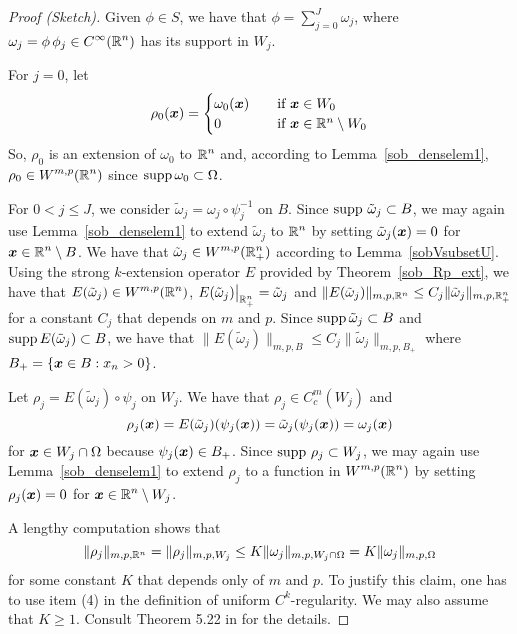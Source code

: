 \begin{proof}[Proof (Sketch)]
Given $\phi \in S$, we have that
$\displaystyle \phi = \sum_{j=0}^J \omega_j$, where
$\displaystyle \omega_j = \phi\, \phi_j \in C^\infty(\mathbb{R}^n)$ has its
support in $W_j$.

For $j=0$, let
\[
\rho_0({\bm{x}})
= \begin{cases}
\omega_0({\bm{x}}) & \quad \text{if} \ {\bm{x}} \in W_0 \\
0 & \quad  \text{if} \ {\bm{x}} \in \mathbb{R}^n\setminus W_0
  \end{cases}
\]
So, $\rho_0$ is an extension of $\omega_0$ to $\displaystyle \mathbb{R}^n$ and,
according to Lemma~\ref{sob_denselem1},
$\displaystyle \rho_0 \in W^{m,p}(\mathbb{R}^n)$
since $\operatorname{supp} \omega_0 \subset \Omega$.

For $0< j \leq J$, we consider
$\displaystyle \tilde{\omega}_j = \omega_j \circ \psi_j^{-1}$ on $B$.
Since $\operatorname{supp}\, \tilde{\omega}_j \subset B$, we may again use
Lemma~\ref{sob_denselem1} to extend $\tilde{\omega}_j$ to
$\displaystyle \mathbb{R}^n$ by setting
$\tilde{\omega}_j({\bm{x}}) = 0$ for
$\displaystyle {\bm{x}} \in \mathbb{R}^n \setminus B$.  We have that
$\displaystyle \tilde{\omega}_j \in W^{m,p}(\mathbb{R}^n_+)$
according to Lemma~\ref{sobVsubsetU}.
Using the strong $k$-extension operator $E$
provided by Theorem~\ref{sob_Rp_ext}, we have that
$\displaystyle E(\tilde{\omega}_j) \in W^{m,p}(\mathbb{R}^n)$,
$E(\tilde{\omega}_j)\big|_{\mathbb{R}^n_+} = \tilde{\omega}_j$ and
$\displaystyle \|E(\tilde{\omega}_j)\|_{m,p,\mathbb{R}^n} \leq
C_j \|\tilde{\omega}_j\|_{m,p,\mathbb{R}^n_+}$
for a constant $C_j$ that depends on $m$ and $p$.
Since $\operatorname{supp} \tilde{\omega}_j \subset B$ and
$\operatorname{supp} E(\tilde{\omega}_j) \subset B$, we have that
$\displaystyle \|E(\tilde{\omega}_j)\|_{m,p,B} \leq
C_j \|\tilde{\omega}_j\|_{m,p,B_+}$ where $B_+= \{{\bm{x}} \in B : x_n> 0\}$.

Let $\rho_j = E(\tilde{\omega}_j) \circ \psi_j$ on $W_j$.  We have
that $\displaystyle \rho_j \in C_c^m(W_j)$ and
\[
\rho_j({\bm{x}}) = E(\tilde{\omega}_j)(\psi_j({\bm{x}}))
= \tilde{\omega}_j(\psi_j({\bm{x}})) = \omega_j({\bm{x}})
\]
for ${\bm{x}} \in W_j \cap \Omega$ because $\psi_j({\bm{x}}) \in B_+$. 
Since $\operatorname{supp}\, \rho_j \subset W_j$, we may again use
Lemma~\ref{sob_denselem1} to extend $\rho_j$ to a
function in $\displaystyle W^{m,p}(\mathbb{R}^n)$ by setting
$\rho_j({\bm{x}}) = 0$ for $\displaystyle {\bm{x}} \in \mathbb{R}^n \setminus W_j$.

A lengthy computation shows that
\[
  \|\rho_j\|_{m,p,\mathbb{R}^n} = \|\rho_j\|_{m,p,W_j} 
\leq K \|\omega_j\|_{m,p,W_j\cap \Omega} = K \|\omega_j\|_{m,p,\Omega}
\]
for some constant $K$ that depends only of $m$ and $p$.  To justify
this claim, one has to use item (4) in the definition of uniform
$\displaystyle C^k$-regularity.  We may also assume that $K \geq 1$.  Consult
Theorem 5.22 in \cite{Ad} for the details.


\end{proof}
